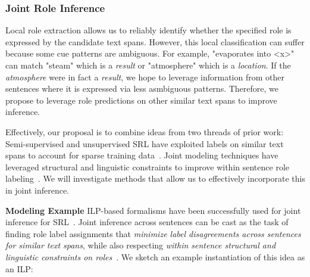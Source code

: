 
\subsubsection{Joint Role Inference}
Local role extraction allows us to reliably identify whether the specified role is expressed by the candidate text spans. 
However, this local classification can suffer because some cue patterns are ambiguous. 
For example, "evaporates into <x>" can match "steam" which is a {\em result} or "atmosphere" which is a {\em location}. 
If the {\em atmosphere} were in fact a {\em result}, we hope to leverage information from other sentences where it is expressed via less asmbiguous patterns.
Therefore, we propose to leverage role predictions on other similar text spans to improve inference. 

Effectively, our proposal is to combine ideas from two threads of prior work:
Semi-supervised and unsupervised SRL have exploited labels on similar text spans to account for sparse training data~\cite{furstenau-emnlp2009,furstenau2012semi,lang-emnlp2011}. 
Joint modeling techniques have leveraged structural and linguistic constraints to improve within sentence role labeling~\cite{punyakanok2004srl,koomen2005generalized,srikumar2011joint}.
We will investigate methods that allow us to effectively incorporate this in joint inference.

{\bf Modeling Example}
ILP-based formalisms have been successfully used for joint inference for SRL~\cite{punyakanok2004srl,koomen2005generalized,srikumar2011joint}. 
Joint inference across sentences can be cast as the task of finding role label assignments that {\em minimize label disagreements across sentences for similar text spans}, 
while also respecting {\em within sentence structural and linguistic constraints on roles}~\cite{punyakanok2004srl}. 
We sketch an example instantiation of this idea as an ILP:

